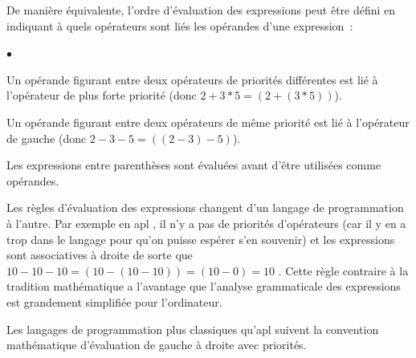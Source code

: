 {\begin{minipage}{\myparboxwidth}
\smallskip

\noindent De manière équivalente, l'ordre d'évaluation des expressions peut être défini
en indiquant à quels opérateurs sont liés les opérandes d'une expression~:
\begin{list}{$\scriptscriptstyle\bullet$}{
}
\item Un opérande figurant entre deux opérateurs de priorités différentes est lié à l'opérateur
de plus forte priorité (donc $2 + 3 \ast 5 = (2 + (3 \ast 5))$).
\item Un opérande figurant entre deux opérateurs de même priorité est lié à l'opérateur
de gauche (donc $2 - 3 - 5 = ((2 - 3) - 5)$).
\item Les expressions entre parenthèses sont évaluées avant d'être utilisées comme opérandes.
\end{list}

\smallskip

Les règles d'évaluation des expressions changent d'un langage de programmation à l'autre.
Par exemple en {\sc apl} \cite{iverson1}, il n'y a pas de priorités d'opérateurs (car il y en a
trop dans le langage pour qu'on puisse espérer s'en souvenir) et les expressions sont associatives 
à droite de sorte que $10 - 10 - 10 = (10 - (10 - 10)) = (10 - 0) = 10$ . Cette règle contraire
à la tradition mathématique a l'avantage que l'analyse grammaticale des expressions est grandement
simplifiée pour l'ordinateur. 

Les langages de programmation plus classiques qu'{\sc apl} sui\-vent la convention
mathématique d'évaluation de gauche à droite avec priorités.


\vspace{\abovedisplayskip}
\end{minipage}
}
